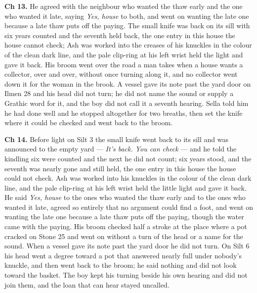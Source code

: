 \documentclass{design/chronicle}
\begin{document}
{\textbf{Ch 13.} He agreed with the neighbour who wanted the thaw early and the one who wanted it late, saying \emph{Yes, house} to both, and went on wanting the late one because a late thaw puts off the paying. The small knife was back on its sill with six years counted and the seventh held back, the one entry in this house the house cannot check; Ash was worked into the creases of his knuckles in the colour of the clean dark line, and the pale clip-ring at his left wrist held the light and gave it back. His broom went over the road a man takes when a house wants a collector, over and over, without once turning along it, and no collector went down it for the woman in the brook. A vessel gave its note past the yard door on Ilmen 28 and his head did not turn; he did not name the sound or supply a Grathic word for it, and the boy did not call it a seventh hearing. Sella told him he had done well and he stopped altogether for two breaths, then set the knife where it could be checked and went back to the broom.

\textbf{Ch 14.} Before light on Silt 3 the small knife went back to its sill and was announced to the empty yard — \emph{It’s back. You can check} — and he told the kindling six were counted and the next he did not count; six years stood, and the seventh was nearly gone and still held, the one entry in this house the house could not check. Ash was worked into his knuckles in the colour of the clean dark line, and the pale clip-ring at his left wrist held the little light and gave it back. He said \emph{Yes, house} to the ones who wanted the thaw early and to the ones who wanted it late, agreed so entirely that no argument could find a foot, and went on wanting the late one because a late thaw puts off the paying, though the water came with the paying. His broom checked half a stroke at the place where a pot cracked on Stone 25 and went on without a turn of the head or a name for the sound. When a vessel gave its note past the yard door he did not turn. On Silt 6 his head went a degree toward a pot that answered nearly full under nobody’s knuckle, and then went back to the broom; he said nothing and did not look toward the basket. The boy kept his turning beside his own hearing and did not join them, and the loan that can hear stayed uncalled.

}
\end{document}
